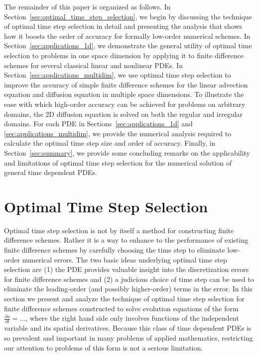 \documentclass[oneeqnum,onefignum,onetabnum,onethmnum]{siamltex}
\begin{document}
The remainder of this paper is organized as follows.  
In Section~\ref{sec:optimal_time_step_selection}, we begin by 
discussing the technique of optimal time step selection in detail and 
presenting the analysis that shows how it boosts the order of accuracy 
for formally low-order numerical schemes.  In 
Section~\ref{sec:applications_1d}, we demonstrate the general utility of 
optimal time selection to problems in one space dimension by applying it to 
finite difference schemes for several classical linear and nonlinear PDEs. 
In Section~\ref{sec:applications_multidim}, we use optimal time step selection 
to improve the accuracy of simple finite difference schemes for the linear 
advection equation and diffusion equation in multiple space dimensions.  
To illustrate the ease with which high-order accuracy can be achieved for
problems on arbitrary domains, the 2D diffusion equation is solved on both 
the regular and irregular domains.  
For each PDE in Sections~\ref{sec:applications_1d} and 
\ref{sec:applications_multidim}, we provide the numerical analysis required 
to calculate the optimal time step size and order of accuracy.  
Finally, in Section~\ref{sec:summary}, we provide some concluding remarks on 
the applicability and limitations of optimal time step selection for the 
numerical solution of general time dependent PDEs.  


\section{\label{sec:optimal_time_step_selection} 
         Optimal Time Step Selection}
Optimal time step selection is not by itself a method for constructing 
finite difference schemes.  Rather it is a way to enhance to the performance
of existing finite difference schemes by carefully choosing the time step to 
eliminate low-order numerical errors.  The two basic ideas underlying 
optimal time step selection are (1) the PDE provides valuable insight into the 
discretization errors for finite difference schemes and (2) a judicious choice 
of time step can be used to eliminate the leading-order (and possibly 
higher-order) terms in the error.  In this section we present and analyze the 
technique of optimal time step selection for finite difference schemes 
constructed to solve evolution equations of the form 
$\frac{\partial u}{\partial t} = \ldots$, where the right hand side only 
involves functions of the independent variable and its spatial derivatives.  
Because this class of time dependent PDEs is so prevalent and important in 
many problems of applied mathematics, restricting our attention to problems 
of this form is not a serious limitation.  
\end{document}
